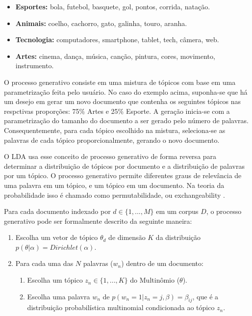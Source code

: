 \documentclass[12pt,a4paper]{article}
\begin{document}
  \begin{itemize}
    \item \textbf{ Esportes:} bola, futebol, basquete, gol, pontos, corrida, natação.
    \item \textbf{ Animais:} coelho, cachorro, gato, galinha, touro, aranha.
    \item \textbf{ Tecnologia:} computadores, smartphone, tablet, tech, câmera, web.
    \item \textbf{ Artes:} cinema, dança, música, canção, pintura, cores, movimento, instrumento.
  \end{itemize}
  
  O processo generativo consiste em uma mistura de tópicos com base em uma parametrização feita pelo usuário. No caso do exemplo acima, suponha-se que há um desejo em gerar um novo documento que contenha os seguintes tópicos nas respctivas proporções: 75\% Artes e 25\% Esporte. A geração inicia-se com a parametrização do tamanho do documento a ser gerado pelo número de palavras. Consequentemente, para cada tópico escolhido na mistura, seleciona-se as palavras de cada tópico proporcionalmente, gerando o novo documento.
  
   O LDA usa esse conceito de processo generativo de forma reversa para determinar a distribuição de tópicos por documento e a distribuição de palavras por um tópico. 
   O processo generativo permite diferentes graus de relevância de uma palavra em um tópico, e um tópico em um documento. Na teoria da probabilidade isso é chamado como permutabilidade,
   ou exchangeability \cite{aldous1985exchangeability}. 
   
   Para cada documento indexado por $d \in \{1,. . . , M\}$ em um corpus $D$, o processo generativo pode ser formalmente descrito da seguinte maneira:
  
  
  \begin{enumerate}
    \item Escolha um vetor de tópico $\theta _d$ de dimensão $K$ da distribuição $p(\theta|\alpha)=Dirichlet(\alpha)$.
    \item Para cada uma das $N$ palavras ($w_n$) dentro de um documento:
    \begin{enumerate}
      \item Escolha um tópico \(z_n \in \{1,. . . , K\}\) do Multinômio ($\theta$).
      \item Escolha uma palavra $w_n$ de \(p(w_n=1| z_n=j,\beta)=\beta _{ij}\), que é a distribuição probabilística multinomial condicionada ao tópico $z_n$.
    \end{enumerate}
  \end{enumerate}
  
\end{document}
